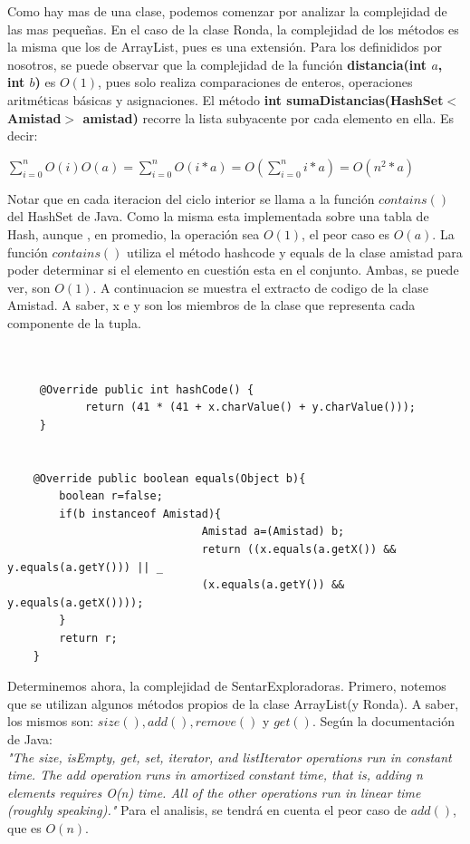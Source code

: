 \documentclass[10pt, a4paper]{article}
\begin{document}
Como hay mas de una clase, podemos comenzar por analizar la complejidad de las mas pequeñas.
En el caso de la clase Ronda, la complejidad de los métodos es la misma que los de ArrayList, pues es una extensión. 
Para los definididos por nosotros, se puede observar que la complejidad de la función \textbf{distancia(int $a$, int $b$)} es $O(1)$, pues solo realiza comparaciones de enteros, operaciones aritméticas básicas y asignaciones.
El método  \textbf{int  sumaDistancias(HashSet$<$Amistad$>$ amistad)} recorre la lista subyacente por cada elemento en ella. Es decir:

\hspace{30mm}$\sum\limits_{i=0}^n O(i)O(a) =  \sum\limits_{i=0}^n O(i*a) = O(\sum\limits_{i=0}^n i*a) = O(n^2*a)$ 

Notar que en cada iteracion del ciclo interior se llama a la función $contains()$ del HashSet de Java. Como la misma esta implementada sobre una tabla de Hash, aunque , en promedio, la operación sea $O(1)$, el peor caso es $O(a)$. La función $contains()$ utiliza el método hashcode y equals de la clase amistad para poder determinar si el elemento en cuestión esta en el conjunto. Ambas, se puede ver, son $O(1)$. A continuacion se muestra el extracto de codigo de la clase Amistad. A saber, x e y son los miembros de la clase que representa cada componente de la tupla.
\begin{verbatim}


	 @Override public int hashCode() {
	        return (41 * (41 + x.charValue() + y.charValue()));
	 }

	 
	@Override public boolean equals(Object b){
		boolean r=false;
		if(b instanceof Amistad){
							  Amistad a=(Amistad) b;
							  return ((x.equals(a.getX()) && y.equals(a.getY())) || _
							  (x.equals(a.getY()) && y.equals(a.getX())));
		}
		return r;
	}

\end{verbatim}


Determinemos ahora, la complejidad de SentarExploradoras.
Primero, notemos que se utilizan algunos métodos propios de la clase ArrayList(y Ronda). A saber, los mismos son: $size(),add(),remove()$ y $get()$. Según la documentación de Java:\\

\textit{"The size, isEmpty, get, set, iterator, and listIterator operations run in constant time. The add operation runs in amortized constant time, that is, adding n elements requires O(n) time. All of the other operations run in linear time (roughly speaking)."} Para el analisis, se tendrá en cuenta el peor caso de $add()$, que es $O(n)$.
\end{document}
